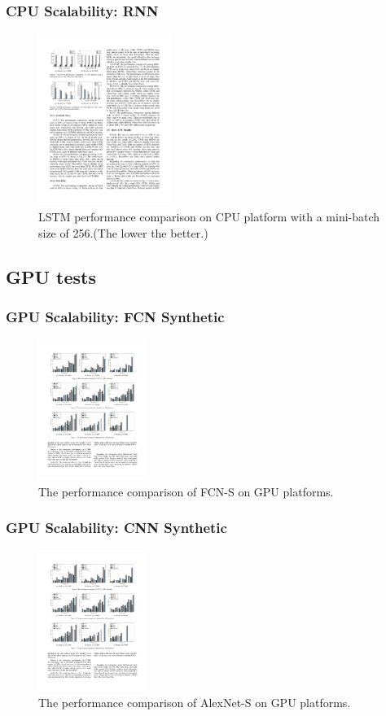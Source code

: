 
\begin{frame}
	\MyLogo
	\frametitle{CPU Scalability: RNN}  
	\begin{figure}[htbp] 
		\includegraphics[height=2.2in]{figures/LSTM1.pdf} 
		\caption{LSTM performance comparison on CPU platform with a mini-batch size of 256.(The lower the better.)}
	\end{figure}
\end{frame}

\subsection{GPU tests}

\begin{frame}
	\MyLogo
	\frametitle{GPU Scalability: FCN Synthetic}

	\begin{figure}[htbp] 
		\includegraphics[height=1.8in]{figures/FCN-S2.pdf} 
		\caption{The performance comparison of FCN-S on GPU platforms.}
	\end{figure}

\end{frame}


\begin{frame}
	\MyLogo
	\frametitle{GPU Scalability: CNN Synthetic}

	\begin{figure}[htbp] 
		\includegraphics[height=1.8in]{figures/AlexNet-S2.pdf} 
		\caption{The performance comparison of AlexNet-S on GPU platforms.}
	\end{figure}

\end{frame}

